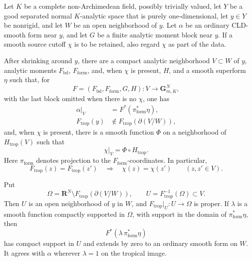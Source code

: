 
\begin{lemma}
\label{lem:p213-arbitrary-valuation-source-localization}
Let $K$ be a complete non-Archimedean field, possibly trivially valued,
let $Y$ be a good separated normal $K$-analytic space that is purely
one-dimensional, let $y\in Y$ be nonrigid, and let $W$ be an open
neighborhood of $y$.  Let $\alpha$ be an ordinary CLD-smooth form near
$y$, and let $G$ be a finite analytic moment block near $y$.  If a smooth
source cutoff $\chi$ is to be retained, also regard $\chi$ as part of the
data.

After shrinking around $y$, there are a compact analytic neighborhood
$V\subset W$ of $y$, analytic moments $F_{\mathrm{bd}}$,
$F_{\mathrm{form}}$, and, when $\chi$ is present, $H$, and a smooth
superform $\eta$ such that, for
\[
 F=(F_{\mathrm{bd}},F_{\mathrm{form}},G,H):V\longrightarrow
       \mathbf G_{m,K}^{N},
\]
with the last block omitted when there is no $\chi$, one has
\begin{align}
 \alpha|_V&=F^*(\pi_{\mathrm{form}}^*\eta),
 \label{eq:p213-arbitrary-source-local-form}\\
 F_{\mathrm{trop}}(y)&\notin
       F_{\mathrm{trop}}(\partial(V/W)),
 \label{eq:p213-arbitrary-source-local-boundary}
\end{align}
and, when $\chi$ is present, there is a smooth function $\Phi$ on a
neighborhood of $H_{\mathrm{trop}}(V)$ such that
\begin{equation}
 \chi|_V=\Phi\circ H_{\mathrm{trop}}.
 \label{eq:p213-arbitrary-source-cutoff-factorization}
\end{equation}
Here $\pi_{\mathrm{form}}$ denotes projection to the
$F_{\mathrm{form}}$-coordinates.  In particular,
\begin{equation}
 F_{\mathrm{trop}}(z)=F_{\mathrm{trop}}(z')
       \quad\Longrightarrow\quad \chi(z)=\chi(z')
       \qquad(z,z'\in V).
 \label{eq:p213-arbitrary-source-cutoff-fibre-constancy}
\end{equation}

Put
\begin{equation}
 \Omega=\mathbf R^N\setminus
       F_{\mathrm{trop}}(\partial(V/W)),
 \qquad U=F_{\mathrm{trop}}^{-1}(\Omega)\subset V.
 \label{eq:p213-arbitrary-source-local-omega}
\end{equation}
Then $U$ is an open neighborhood of $y$ in $W$, and
$F_{\mathrm{trop}}|_U:U\to\Omega$ is proper.  If $\lambda$ is a smooth
function compactly supported in $\Omega$, with support in the domain of
$\pi_{\mathrm{form}}^*\eta$, then
\[
 F^*(\lambda\,\pi_{\mathrm{form}}^*\eta)
\]
has compact support in $U$ and extends by zero to an ordinary smooth form
on $W$.  It agrees with $\alpha$ wherever $\lambda=1$ on the tropical
image.


\end{lemma}
